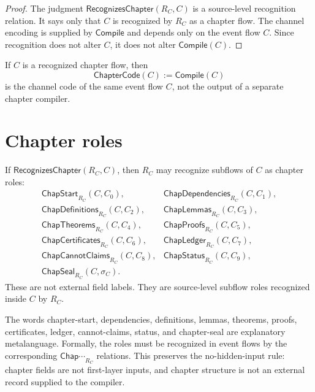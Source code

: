\begin{proof}
The judgment $\mathsf{RecognizesChapter}(R_C,C)$ is a source-level recognition relation. It says only that $C$ is recognized by $R_C$ as a chapter flow. The channel encoding is supplied by $\mathsf{Compile}$ and depends only on the event flow $C$. Since recognition does not alter $C$, it does not alter $\mathsf{Compile}(C)$.
\end{proof}

\begin{corollary}
\label{cor:chapter-generated-code-not-new-code}
If $C$ is a recognized chapter flow, then
$$
  \mathsf{ChapterCode}(C):=\mathsf{Compile}(C)
$$
is the channel code of the same event flow $C$, not the output of a separate chapter compiler.
\end{corollary}

\section{Chapter roles}
\label{sec:chapter-generated-roles}

\begin{definition}
\label{def:chapter-generated-subflows}
If $\mathsf{RecognizesChapter}(R_C,C)$, then $R_C$ may recognize subflows of $C$ as chapter roles:
$$
\begin{array}{ll}
  \mathsf{ChapStart}_{R_C}(C,C_0),&
  \mathsf{ChapDependencies}_{R_C}(C,C_1),\\
  \mathsf{ChapDefinitions}_{R_C}(C,C_2),&
  \mathsf{ChapLemmas}_{R_C}(C,C_3),\\
  \mathsf{ChapTheorems}_{R_C}(C,C_4),&
  \mathsf{ChapProofs}_{R_C}(C,C_5),\\
  \mathsf{ChapCertificates}_{R_C}(C,C_6),&
  \mathsf{ChapLedger}_{R_C}(C,C_7),\\
  \mathsf{ChapCannotClaims}_{R_C}(C,C_8),&
  \mathsf{ChapStatus}_{R_C}(C,C_9),\\
  \mathsf{ChapSeal}_{R_C}(C,\sigma_C).
\end{array}
$$
These are not external field labels. They are source-level subflow roles recognized inside $C$ by $R_C$.
\end{definition}

\begin{remark}
\label{rem:chapter-generated-field-names-metalanguage}
The words chapter-start, dependencies, definitions, lemmas, theorems, proofs, certificates, ledger, cannot-claims, status, and chapter-seal are explanatory metalanguage. Formally, the roles must be recognized in event flows by the corresponding $\mathsf{Chap\cdots}_{R_C}$ relations. This preserves the no-hidden-input rule: chapter fields are not first-layer inputs, and chapter structure is not an external record supplied to the compiler.
\end{remark}

